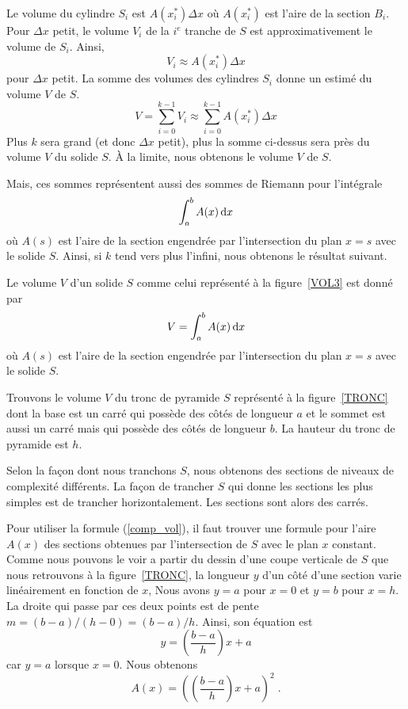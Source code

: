 {

Le volume du cylindre $S_i$ est $A(x_i^\ast) \Delta x$ où $A(x_i^\ast)$ est
l'aire de la section $B_i$.  Pour $\Delta x$ petit, le volume $V_i$ de la
$i^e$ tranche de $S$ est approximativement le volume de $S_i$.  Ainsi,
\[
V_i \approx A(x_i^\ast) \Delta x
\]
pour $\Delta x$ petit.  La somme des volumes des cylindres $S_i$ donne un
estimé du volume $V$ de $S$.
\[
V = \sum_{i=0}^{k-1} V_i \approx \sum_{i=0}^{k-1} A(x_i^\ast) \Delta x
\]
Plus $k$ sera grand (et donc $\Delta x$ petit), plus la somme ci-dessus sera
près du volume $V$ du solide $S$.  À la limite, nous obtenons le volume $V$ de
$S$.

Mais, ces sommes représentent aussi des sommes de Riemann pour l'intégrale
\[
\int_a^b A(x)\,\mathrm{d}x
\]
où $A(s)$ est l'aire de la section engendrée par l'intersection du plan $x=s$
avec le solide $S$.  Ainsi, si $k$ tend vers plus l'infini, nous
obtenons le résultat suivant.

\begin{meth}
Le volume $V$ d'un solide $S$ comme celui représenté à la
figure~\ref{VOL3} est donné par
\begin{equation}\label{comp_vol}
V = \int_a^b A(x)\,\mathrm{d}x
\end{equation}
où $A(s)$ est l'aire de la section engendrée par l'intersection du
plan $x=s$ avec le solide $S$.
\end{meth}

\begin{egg}
Trouvons le volume $V$ du tronc de pyramide $S$ représenté à la
figure~\ref{TRONC} dont la base est un carré qui possède des côtés de
longueur $a$ et le sommet est aussi un carré mais qui possède des côtés de
longueur $b$.  La hauteur du tronc de pyramide est $h$.

Selon la façon dont nous tranchons $S$, nous obtenons des sections de
niveaux de complexité différents.  La façon de trancher $S$ qui donne
les sections les plus simples est de trancher horizontalement.  Les
sections sont alors des carrés.

Pour utiliser la formule (\ref{comp_vol}), il faut trouver une formule pour
l'aire $A(x)$ des sections obtenues par l'intersection de $S$ avec le plan
$x$ constant.  Comme nous pouvons le voir a partir du dessin d'une
coupe verticale de $S$ que nous retrouvons à la figure~\ref{TRONC}, la
longueur $y$ d'un côté d'une section varie linéairement en fonction de
$x$,  Nous avons $y=a$ pour $x=0$
et $y=b$ pour $x=h$.  La droite qui passe par ces deux points est de pente 
$m = (b-a)/(h-0) = (b-a)/h$.  Ainsi, son équation est
\[
y = \left(\frac{b-a}{h}\right) x + a
\]
car $y=a$ lorsque $x=0$.  Nous obtenons
\[
A(x) = \left( \left(\frac{b-a}{h}\right) x + a \right)^2 \; .
\]


\end{egg}}
